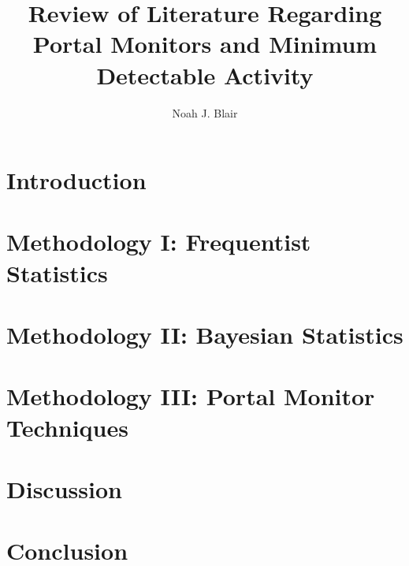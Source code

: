 \documentclass[12 pt]{article}
\title{Review of Literature Regarding Portal Monitors and Minimum Detectable Activity}
\author{Noah J. Blair}
\begin{document}
\maketitle
\begin{abstract}
  \noindent
  
\end{abstract}
\tableofcontents
\newpage
\section{Introduction}\label{toc:s.introduction}

\section{Methodology I: Frequentist Statistics}\label{toc:s.methodology.Frequentist}

\section{Methodology II: Bayesian Statistics}\label{toc:s.methodology.Bayesian}

\section{Methodology III: Portal Monitor Techniques}\label{toc:s.methodology.PortalMonitors}

\section{Discussion}\label{toc:s.discussion}

\section{Conclusion}\label{toc:s.conclusion}

\newpage
{}

\end{document}
